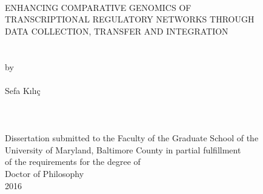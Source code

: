 
\thispagestyle{empty}
\hbox{\ }
\vspace{1in}
\renewcommand{\baselinestretch}{1}
\small\normalsize
\begin{center}

\large{{ENHANCING COMPARATIVE GENOMICS OF \\
TRANSCRIPTIONAL REGULATORY NETWORKS THROUGH\\
DATA COLLECTION, TRANSFER AND INTEGRATION}}\\
\ \\
\ \\
\large{by} \\
\ \\
\large{Sefa Kılıç}%
\ \\
\ \\
\ \\
\ \\
\normalsize
Dissertation submitted to the Faculty of the Graduate School of the \\
University of Maryland, Baltimore County in partial fulfillment \\
of the requirements for the degree of \\
Doctor of Philosophy \\
2016
\end{center}

\vspace{7.5em}

